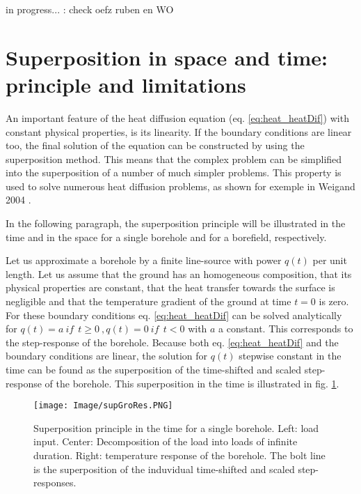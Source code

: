 \documentclass[a4paper,oneside,11pt]{report}
\begin{document}
in progress... : check oefz ruben en WO

\section{Superposition in space and time: principle and limitations}  \label{sec:heat_sup}

An important feature of the heat diffusion equation (eq. \ref{eq:heat_heatDif}) with constant physical properties, is its linearity. If the boundary conditions are linear too, the final solution of the equation can be constructed by using the superposition method. This means that the complex problem can be simplified into the superposition of a number of much simpler problems. This property is used to solve numerous heat diffusion problems, as shown for exemple in Weigand 2004 \cite{wei04}.


In the following paragraph, the superposition principle will be illustrated in the time and in the space for a single borehole and for a borefield, respectively.

Let us approximate a borehole by a finite line-source with power $q(t)$ per unit length. Let us assume that the ground has an homogeneous composition, that its physical properties are constant, that the heat transfer towards the surface is negligible and that the temperature gradient of the ground at time $t=0$ is zero. For these boundary conditions eq. \ref{eq:heat_heatDif} can be solved analytically for $q(t) = a \ if \ \ t \geq 0 \ , q(t) = 0 \ if \ \ t < 0$ with $a$ a constant. This corresponds to the step-response of the borehole. Because both eq. \ref{eq:heat_heatDif} and the boundary conditions are linear, the solution for $q(t)$ stepwise constant in the time can be found as the superposition of the time-shifted and scaled step-response of the borehole. This superposition in the time is illustrated in fig. \ref{fig:heat_sup}.

\begin{figure}[hbtp] 
	\centering
	\texttt{[image: Image/supGroRes.PNG]}
	\caption{ Superposition principle in the time for a single borehole. Left: load input. Center: Decomposition of the load into loads of infinite duration. Right: temperature response of the borehole. The bolt line is the superposition of the induvidual time-shifted and scaled step-responses.}
	\label{fig:heat_sup}
\end{figure}
\end{document}
